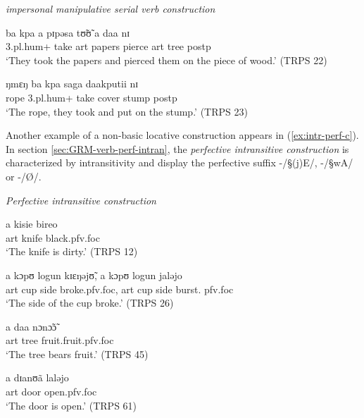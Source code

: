 \begin{exe}
\ex\label{ex:TRPSimpersmanipu-SVC}{\it impersonal manipulative serial verb
construction}

\begin{xlist}

\ex\label{ex:TRPS22-SVC}
\gll ba kpa a pɪpəsa tʊ̃ʊ̃ a daa nɪ\\
{\sc 3.pl.hum+} take {\sc art} papers pierce
{\sc art} tree {\sc postp}  \\
\glt `They  took the papers and pierced them on the piece of wood.' (TRPS 22)


\ex\label{ex:TRPS23-SVC}
\gll ŋmɛŋ ba kpa saga daakputii nɪ\\
rope {\sc 3.pl.hum+} take cover stump {\sc postp} \\
\glt `The rope, they took and put on the stump.' (TRPS 23)
\end{xlist}


\end{exe}



Another example of a non-basic locative construction appears in
(\ref{ex:intr-perf-c}). In section \ref{sec:GRM-verb-perf-intran}, the 
  \textit{perfective intransitive construction}  is
characterized  by intransitivity and  display the
perfective suffix -/{\S (j)E}/,  -/{\S wA}/ or -/\O/.



\begin{exe}
\ex\label{ex:intr-perf-c}\textit{Perfective intransitive construction}

\begin{xlist}
\ex\label{ex:TRPS12-IPC}
\gll a kisie bireo\\
 {\sc art} knife black.{\sc pfv.foc}\\
\glt `The knife is dirty.' (TRPS 12)


% 


\ex\label{ex:}
\gll a kɔpʊ logun kɪɛŋəjʊ̃, a kɔpʊ logun jaləjo\\
  {\sc art} cup side broke.{\sc pfv.foc},    {\sc art} cup side burst.{\sc
pfv.foc}\\
\glt `The side of the cup broke.' (TRPS 26)



\ex\label{ex:}
\gll a daa nɔnɔ̃ɔ̃\\
 {\sc art} tree fruit.fruit.{\sc pfv.foc} \\
\glt `The tree bears fruit.' (TRPS 45)


\ex\label{ex:}
\gll a dɪanʊã laləjo\\
 {\sc art} door open.{\sc pfv.foc}\\
\glt `The door is open.' (TRPS 61)

\end{xlist}
\end{exe}



